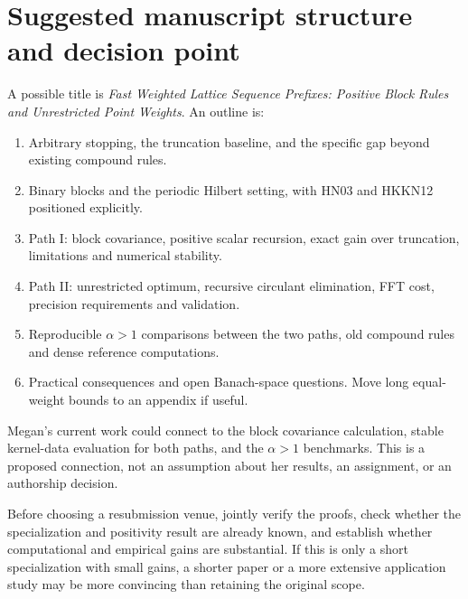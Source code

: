 \documentclass[11pt]{article}
\begin{document}
\section{Suggested manuscript structure and decision point}
A possible title is \emph{Fast Weighted Lattice Sequence Prefixes:
Positive Block Rules and Unrestricted Point Weights}.
An outline is:
\begin{enumerate}
\item Arbitrary stopping, the truncation baseline, and the specific
gap beyond existing compound rules.
\item Binary blocks and the periodic Hilbert setting, with HN03 and
HKKN12 positioned explicitly.
\item Path I: block covariance, positive scalar recursion, exact gain
over truncation, limitations and numerical stability.
\item Path II: unrestricted optimum, recursive circulant elimination,
FFT cost, precision requirements and validation.
\item Reproducible $\alpha>1$ comparisons between the two paths,
old compound rules and dense reference computations.
\item Practical consequences and open Banach-space questions.
Move long equal-weight bounds to an appendix if useful.
\end{enumerate}
Megan's current work could connect to the block covariance calculation,
stable kernel-data evaluation for both paths, and the $\alpha>1$ benchmarks.
This is a proposed connection, not an assumption about her results,
an assignment, or an authorship decision.

Before choosing a resubmission venue, jointly verify the proofs,
check whether the specialization and positivity result are already
known, and establish whether computational and empirical gains are
substantial. If this is only a short specialization with small gains,
a shorter paper or a more extensive application study may be more
convincing than retaining the original scope.
\end{document}

